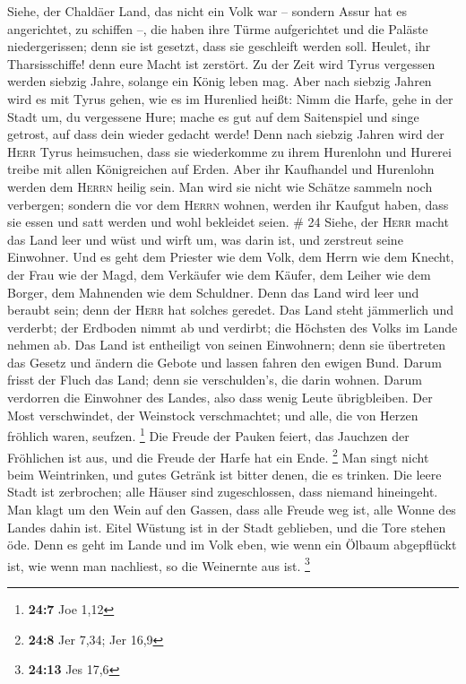  Siehe, der Chaldäer Land, das nicht ein Volk war --
sondern Assur hat es angerichtet, zu schiffen --, die haben ihre Türme
aufgerichtet und die Paläste niedergerissen; denn sie ist gesetzt, dass
sie geschleift werden soll.  Heulet, ihr Tharsisschiffe!
denn eure Macht ist zerstört.  Zu der Zeit wird Tyrus
vergessen werden siebzig Jahre, solange ein König leben mag. Aber nach
siebzig Jahren wird es mit Tyrus gehen, wie es im Hurenlied heißt:
 Nimm die Harfe, gehe in der Stadt um, du vergessene
Hure; mache es gut auf dem Saitenspiel und singe getrost, auf dass dein
wieder gedacht werde!  Denn nach siebzig Jahren wird der
\textsc{Herr} Tyrus heimsuchen, dass sie wiederkomme zu ihrem Hurenlohn
und Hurerei treibe mit allen Königreichen auf Erden. 
Aber ihr Kaufhandel und Hurenlohn werden dem \textsc{Herrn} heilig sein.
Man wird sie nicht wie Schätze sammeln noch verbergen; sondern die vor
dem \textsc{Herrn} wohnen, werden ihr Kaufgut haben, dass sie essen und
satt werden und wohl bekleidet seien. \# 24  Siehe, der
\textsc{Herr} macht das Land leer und wüst und wirft um, was darin ist,
und zerstreut seine Einwohner.  Und es geht dem Priester
wie dem Volk, dem Herrn wie dem Knecht, der Frau wie der Magd, dem
Verkäufer wie dem Käufer, dem Leiher wie dem Borger, dem Mahnenden wie
dem Schuldner.  Denn das Land wird leer und beraubt sein;
denn der \textsc{Herr} hat solches geredet.  Das Land
steht jämmerlich und verderbt; der Erdboden nimmt ab und verdirbt; die
Höchsten des Volks im Lande nehmen ab.  Das Land ist
entheiligt von seinen Einwohnern; denn sie übertreten das Gesetz und
ändern die Gebote und lassen fahren den ewigen Bund. 
Darum frisst der Fluch das Land; denn sie verschulden's, die darin
wohnen. Darum verdorren die Einwohner des Landes, also dass wenig Leute
übrigbleiben.  Der Most verschwindet, der Weinstock
verschmachtet; und alle, die von Herzen fröhlich waren, seufzen.
\footnote{\textbf{24:7} Joe 1,12}  Die Freude der Pauken
feiert, das Jauchzen der Fröhlichen ist aus, und die Freude der Harfe
hat ein Ende. \footnote{\textbf{24:8} Jer 7,34; Jer 16,9} 
Man singt nicht beim Weintrinken, und gutes Getränk ist bitter denen,
die es trinken.  Die leere Stadt ist zerbrochen; alle
Häuser sind zugeschlossen, dass niemand hineingeht.  Man
klagt um den Wein auf den Gassen, dass alle Freude weg ist, alle Wonne
des Landes dahin ist.  Eitel Wüstung ist in der Stadt
geblieben, und die Tore stehen öde.  Denn es geht im
Lande und im Volk eben, wie wenn ein Ölbaum abgepflückt ist, wie wenn
man nachliest, so die Weinernte aus ist. \footnote{\textbf{24:13} Jes
  17,6}


